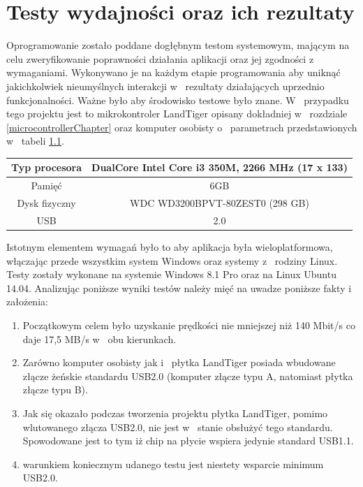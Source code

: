 \documentclass{BscUS}
\begin{document}
\chapter{Testy wydajności oraz ich rezultaty}
\label{resultsChapter}
\indent Oprogramowanie zostało poddane dogłębnym testom systemowym, mającym na celu zweryfikowanie poprawności działania aplikacji oraz jej zgodności z~ wymaganiami. Wykonywano je na każdym etapie programowania aby uniknąć jakichkolwiek nieumyślnych interakcji w~ rezultaty działających uprzednio funkcjonalności. Ważne było aby środowisko testowe było znane. W~ przypadku tego projektu jest to mikrokontroler LandTiger opisany dokładniej w~ rozdziale \ref{microcontrollerChapter} oraz komputer osobisty o~ parametrach przedstawionych w~ tabeli \ref{tbl:pcParameters}.
\begin{table}[H]
\centering
\begin{tabular}{|c|c|}
\hline
	\rowcolor[gray]{0.8}
	Typ procesora & DualCore Intel Core i3 350M, 2266 MHz (17 x 133) \\ \hline
	
	Pamięć & 6GB \\ \hline
	 \rowcolor[gray]{0.8}
	 Dysk fizyczny & WDC WD3200BPVT-80ZEST0  (298 GB) \\ \hline
	USB & 2.0 \\ \hline
\end{tabular}
\captionsetup{justification=centering}
\label{tbl:pcParameters}
\end{table}
\noindent Istotnym elementem wymagań było to aby aplikacja była wieloplatformowa, włączając przede wszystkim system Windows oraz systemy z~ rodziny Linux. Testy zostały wykonane na systemie Windows 8.1 Pro oraz na Linux Ubuntu 14.04.
\noindent Analizując poniższe wyniki testów należy mięć na uwadze poniższe fakty i~ założenia:
\begin{enumerate}
\item Początkowym celem było uzyskanie prędkości nie mniejszej niż 140 Mbit/s co daje 17,5 MB/s w~ obu kierunkach.
\item Zarówno komputer osobisty jak i~ płytka LandTiger posiada wbudowane złącze żeńskie standardu USB2.0 (komputer złącze typu A, natomiast płytka złącze typu B).
\item Jak się okazało podczas tworzenia projektu płytka LandTiger, pomimo wlutowanego złącza USB2.0, nie jest w~ stanie obsłużyć tego standardu. Spowodowane jest to tym iż chip na płycie wspiera jedynie standard USB1.1.
\item warunkiem koniecznym udanego testu jest niestety wsparcie minimum USB2.0.
\end{enumerate}
\end{document}
